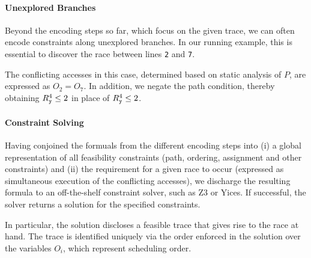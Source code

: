\paragraph{Unexplored Branches} Beyond the encoding steps so far, which focus on the given trace, we can often encode constraints along unexplored branches. In our running example, this is essential to discover the race between lines {\tt 2} and {\tt 7}. 

The conflicting accesses in this case, determined based on static analysis of $P$, are expressed as $O_2=O_7$. In addition, we negate the path condition, thereby obtaining $R_{\tt y}^4 \leq 2$ in place of $R_{\tt y}^4 \leq 2$. 

\paragraph{Constraint Solving} Having conjoined the formuals from the different encoding steps into (i) a global representation of all feasibility constraints (path, ordering, assignment and other constraints) and (ii) the requirement for a given race to occur (expressed as simultaneous execution of the conflicting accesses), we discharge the resulting formula to an off-the-shelf constraint solver, such as Z3 or Yices. If successful, the solver returns a solution for the specified constraints. 

In particular, the solution discloses a feasible trace that gives rise to the race at hand. The trace is identified uniquely via the order enforced in the solution over the variables $O_i$, which represent scheduling order. 
